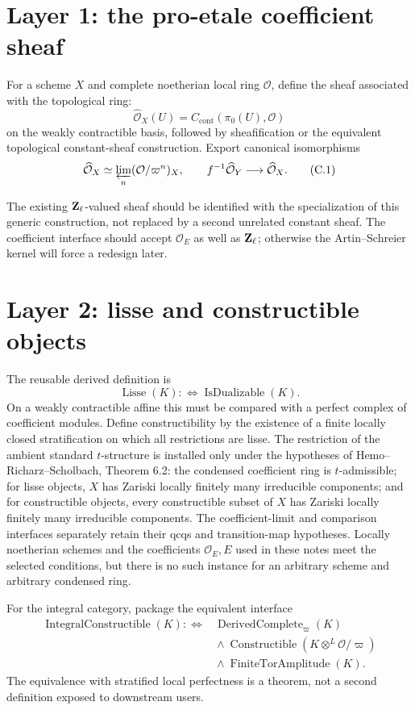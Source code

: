 \section{Layer 1: the pro-etale coefficient sheaf}

For a scheme \(X\) and complete noetherian local ring \(\mathcal O\), define
the sheaf associated with the topological ring:
\[
 \widehat{\mathcal O}_X(U)
   =C_{\mathrm{cont}}(\pi_0(U),\mathcal O)
\]
on the weakly contractible basis, followed by sheafification or the
equivalent topological constant-sheaf construction.  Export canonical
isomorphisms
\[
 \widehat{\mathcal O}_X
   \simeq\varprojlim_n(\mathcal O/\varpi^n)_X,
\qquad
 f^{-1}\widehat{\mathcal O}_Y
   \longrightarrow\widehat{\mathcal O}_X.
\tag{C.1}\label{eq:formalization-coefficient-sheaf}
\]

The existing \(\mathbf Z_\ell\)-valued sheaf should be identified with the specialization
of this generic construction, not replaced by a second unrelated constant
sheaf.  The coefficient interface should accept \(\mathcal O_E\) as well as
\(\mathbf Z_\ell\); otherwise the Artin--Schreier kernel will force a redesign later.

\section{Layer 2: lisse and constructible objects}

The reusable derived definition is
\[
 \operatorname{Lisse}(K)
   :\Longleftrightarrow
   \operatorname{IsDualizable}(K).
\tag{C.2}\label{eq:formalization-lisse-dualizable}
\]
On a weakly contractible affine this must be compared with a perfect complex
of coefficient modules.  Define constructibility by the existence of a
finite locally closed stratification on which all restrictions are lisse.
The restriction of the ambient standard \(t\)-structure is installed only
under the hypotheses of Hemo--Richarz--Scholbach, Theorem 6.2: the condensed
coefficient ring is \(t\)-admissible; for lisse objects, \(X\) has Zariski
locally finitely many irreducible components; and for constructible objects,
every constructible subset of \(X\) has Zariski locally finitely many
irreducible components.  The coefficient-limit and comparison interfaces
separately retain their qcqs and transition-map hypotheses.  Locally
noetherian schemes and the coefficients \(\mathcal O_E,E\) used in these
notes meet the selected conditions, but there is no such instance for an
arbitrary scheme and arbitrary condensed ring.

For the integral category, package the equivalent interface
\[
\begin{aligned}
\operatorname{IntegralConstructible}(K)
 :\Longleftrightarrow{}&
 \operatorname{DerivedComplete}_\varpi(K)\\
 &{}\land
 \operatorname{Constructible}
   (K\otimes^L\mathcal O/\varpi)\\
 &{}\land
 \operatorname{FiniteTorAmplitude}(K).
\end{aligned}
\tag{C.3}\label{eq:formalization-integral-constructible}
\]
The equivalence with stratified local perfectness is a theorem, not a second
definition exposed to downstream users.

